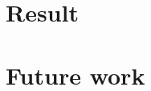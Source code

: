 \documentclass[
10pt, %
a4paper, %
oneside, %
headinclude,footinclude, %
BCOR5mm, %
]{scrartcl}
\begin{document}

\section{Result}


\section{Future work}




\end{document}
